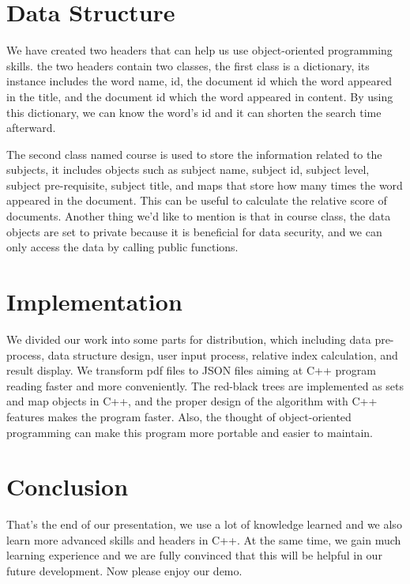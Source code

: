\documentclass{article}
\begin{document}
\section{Data Structure}
We have created two headers that can help us use object-oriented programming skills. the two headers contain two classes, the first class is a dictionary, its instance includes the word name, id, the document id which the word appeared in the title, and the document id which the word appeared in content. By using this dictionary, we can know the word's id and it can shorten the search time afterward. 

The second class named course is used to store the information related to the subjects, it includes objects such as subject name, subject id, subject level, subject pre-requisite, subject title, and maps that store how many times the word appeared in the document. This can be useful to calculate the relative score of documents. Another thing we'd like to mention is that in course class, the data objects are set to private because it is beneficial for data security, and we can only access the data by calling public functions.

\section{Implementation}
We divided our work into some parts for distribution, which including data pre-process, data structure design, user input process, relative index calculation, and result display. We transform pdf files to JSON files aiming at C++ program reading faster and more conveniently. The red-black trees are implemented as sets and map objects in C++, and the proper design of the algorithm with C++ features makes the program faster. Also, the thought of object-oriented programming can make this program more portable and easier to maintain.

\section{Conclusion}
That's the end of our presentation, we use a lot of knowledge learned and we also learn more advanced skills and headers in C++. At the same time, we gain much learning experience and we are fully convinced that this will be helpful in our future development. Now please enjoy our demo.
\end{document}

